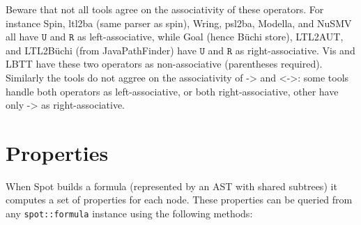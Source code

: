 \documentclass[a4paper,twoside,10pt,DIV=12]{scrreprt}
\newcommand{\U}{\mathbin{\texttt{U}}}
\newcommand{\R}{\mathbin{\texttt{R}}}
\newcommand{\IMPLIES}{\mathbin{\texttt{->}}}
\newcommand{\EQUIV}{\mathbin{\texttt{<->}}}
\newcommand{\0}{\texttt{0}}
\newcommand{\1}{\texttt{1}}
\begin{document}
Beware that not all tools agree on the associativity of these
operators.  For instance Spin, ltl2ba (same parser as spin), Wring,
psl2ba, Modella, and NuSMV all have $\U$ and $\R$ as left-associative,
while Goal (hence Büchi store), LTL2AUT, and LTL2Büchi (from
JavaPathFinder) have $\U$ and $\R$ as right-associative.  Vis and LBTT
have these two operators as non-associative (parentheses required).
Similarly the tools do not aggree on the associativity of $\IMPLIES$
and $\EQUIV$: some tools handle both operators as left-associative, or
both right-associative, other have only $\IMPLIES$ as right-associative.


\chapter{Properties}

When Spot builds a formula (represented by an AST with shared
subtrees) it computes a set of properties for each node.  These
properties can be queried from any \texttt{spot::formula}
instance using the following methods:
\end{document}

